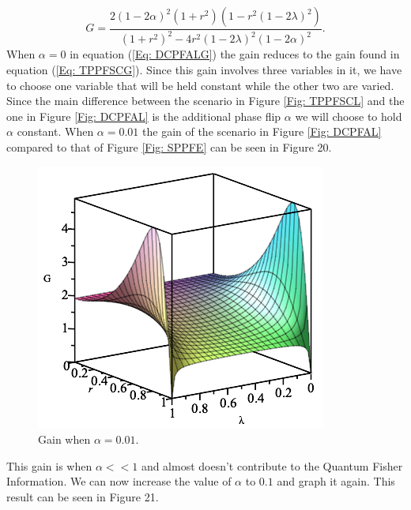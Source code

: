 \documentclass[twocolumn]{article}
\begin{document}
\begin{equation}\label{Eq: DCPFALG}
G=\frac{2(1-2\alpha)^2(1+r^2)(1-r^2(1-2\lambda)^2)}{(1+r^2)^2-4r^2(1-2\lambda)^2(1-2\alpha)^2}.
\end{equation}
When $\alpha=0$ in equation (\ref{Eq: DCPFALG}) the gain reduces to the gain found in equation (\ref{Eq: TPPFSCG}). Since this gain involves three variables in it, we have to choose one variable that will be held constant while the other two are varied. Since the main difference between the scenario in Figure \ref{Fig: TPPFSCL} and the one in Figure \ref{Fig: DCPFAL} is the additional phase flip $\alpha$ we will choose to hold $\alpha$ constant. When $\alpha=0.01$ the gain of the scenario in Figure \ref{Fig: DCPFAL} compared to that of Figure \ref{Fig: SPPFE} can be seen in Figure 20.
\begin{figure}[ht]
    \centering
    \includegraphics[scale=0.6]{Phase-Flip-Two-Channel-Alpha=001-Gain.png}
    \caption{\footnotesize{Gain when $\alpha=0.01$.}}
    \label{Fig: DCPFA001G}
\end{figure}
\par \noindent
This gain is when $\alpha<<1$ and almost doesn't contribute to the Quantum Fisher Information. We can now increase the value of $\alpha$ to $0.1$ and graph it again. This result can be seen in Figure 21.
\end{document}
